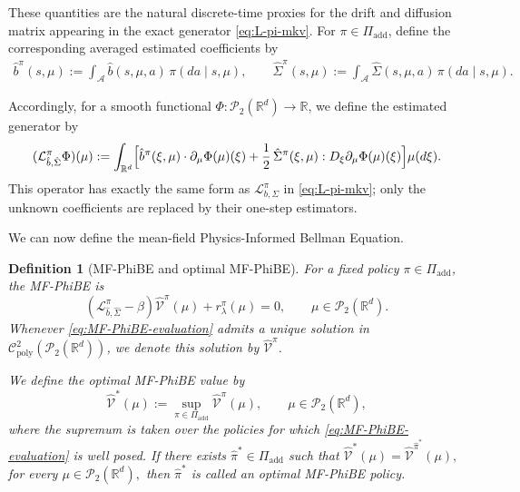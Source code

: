 \documentclass[a4paper, 10pt, english, reqno]{amsart}
\newtheorem{definition}[theorem]{Definition}
\begin{document}
These quantities are the natural discrete-time proxies for the drift and
diffusion matrix appearing in the exact generator
\eqref{eq:L-pi-mkv}. For $\pi\in\Pi_{\mathrm{add}}$, define the corresponding averaged
estimated coefficients by
\begin{align}\label{eq:averaged_b_sigma_hat}
    \hat b^\pi(s,\mu)
  :=
  \int_{\mathcal A}\hat b(s,\mu,a)\,\pi(da\mid s,\mu),
  \qquad
  \hat\Sigma^\pi(s,\mu)
  :=
  \int_{\mathcal A}\hat\Sigma(s,\mu,a)\,\pi(da\mid s,\mu).
\end{align}

Accordingly, for a smooth functional
$\Phi:\mathcal P_2(\mathbb R^d)\to\mathbb R$, we define the estimated
generator by
\begin{equation}
\label{eq:estimated-generator-mkv}
\begin{aligned}
(\mathcal L_{\hat b,\hat\Sigma}^\pi \Phi)(\mu)
:=
\int_{\mathbb R^d}
\Bigl[
\hat b^\pi(\xi,\mu)\cdot \partial_\mu \Phi(\mu)(\xi)
+\frac12\,\hat\Sigma^\pi(\xi,\mu):D_\xi\partial_\mu\Phi(\mu)(\xi)
\Bigr]\mu(d\xi).
\end{aligned}
\end{equation}
This operator has exactly the same form as
$\mathcal L_{b,\Sigma}^\pi$ in \eqref{eq:L-pi-mkv}; only the unknown
coefficients are replaced by their one-step estimators.

We can now define the mean-field Physics-Informed Bellman Equation.

\begin{definition}[MF-PhiBE and optimal MF-PhiBE]
\label{def:MF-PhiBE-mkv}
For a fixed policy $\pi\in\Pi_{\mathrm{add}}$, the MF-PhiBE is
\begin{equation}
\label{eq:MF-PhiBE-evaluation}
(\mathcal L_{\hat b,\hat\Sigma}^\pi-\beta)\hat{\mathcal V}^\pi(\mu)
+r_\lambda^\pi(\mu)
=
0,
\qquad
\mu\in\mathcal P_2(\mathbb R^d).
\end{equation}
Whenever \eqref{eq:MF-PhiBE-evaluation} admits a unique solution in
$\mathcal C^2_{\mathrm{poly}}(\mathcal P_2(\mathbb R^d))$, we denote
this solution by $\hat{\mathcal V}^\pi$.

We define the optimal MF-PhiBE value by
\begin{equation}
\label{eq:MF-PhiBE-optimal}
\hat{\mathcal V}^*(\mu)
:=
\sup_{\pi\in\Pi_{\mathrm{add}}}
\hat{\mathcal V}^\pi(\mu),
\qquad
\mu\in\mathcal P_2(\mathbb R^d),
\end{equation}
where the supremum is taken over the policies for which
\eqref{eq:MF-PhiBE-evaluation} is well posed. If there exists
$\hat\pi^*\in\Pi_{\mathrm{add}}$ such that $\hat{\mathcal V}^*(\mu)
=
\hat{\mathcal V}^{\hat\pi^*}(\mu),$ for every $\mu\in\mathcal P_2(\mathbb R^d),$ then $\hat\pi^*$ is called an optimal MF-PhiBE policy.
\end{definition}
\end{document}
